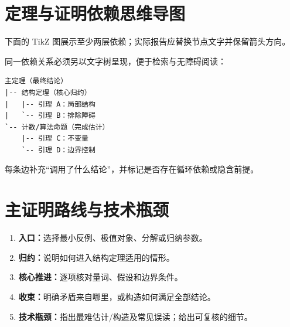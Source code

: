 \documentclass[UTF8,11pt,a4paper,fontset=fandol]{ctexart}
\theoremstyle{definition}
\theoremstyle{remark}
\begin{document}
\section{定理与证明依赖思维导图}
下面的 TikZ 图展示至少两层依赖；实际报告应替换节点文字并保留箭头方向。
\begin{center}
\end{center}

同一依赖关系必须另以文字树呈现，便于检索与无障碍阅读：
\begin{verbatim}
主定理（最终结论）
|-- 结构定理（核心归约）
|   |-- 引理 A：局部结构
|   `-- 引理 B：排除障碍
`-- 计数/算法命题（完成估计）
    |-- 引理 C：不变量
    `-- 引理 D：边界控制
\end{verbatim}
每条边补充“调用了什么结论”，并标记是否存在循环依赖或隐含前提。

\section{主证明路线与技术瓶颈}
\begin{enumerate}
  \item \textbf{入口：}选择最小反例、极值对象、分解或归纳参数。
  \item \textbf{归约：}说明如何进入结构定理适用的情形。
  \item \textbf{核心推进：}逐项核对量词、假设和边界条件。
  \item \textbf{收束：}明确矛盾来自哪里，或构造如何满足全部结论。
  \item \textbf{技术瓶颈：}指出最难估计/构造及常见误读；给出可复核的细节。
\end{enumerate}
\end{document}

